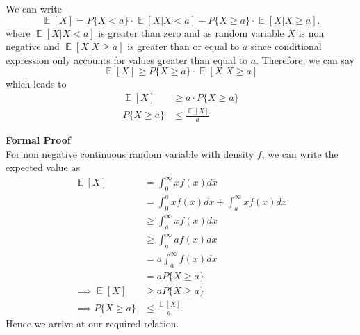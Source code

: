 \begin{solution}
 We can write 
 \begin{equation}
     \mathop{\mathbb{E}}[X]= P\{X<a\}\cdot \mathop{\mathbb{E}}[X|X<a]+P\{X\geq a\}\cdot  \mathop{\mathbb{E}}[X|X\geq a].
 \end{equation}
 where $\mathop{\mathbb{E}}[X|X<a]$ is greater than zero and as random variable $X $ is non negative and $\mathop{\mathbb{E}}[X|X\geq a]$ is greater than or equal to $a$ since conditional expression only accounts for values greater than equal to $a$. Therefore, we can say
 \begin{equation}
     \mathop{\mathbb{E}}[X]\geq P\{X\geq a\}\cdot  \mathop{\mathbb{E}}[X|X\geq a]
 \end{equation}
 which leads to 
 \begin{align}   
     \mathop{\mathbb{E}}[X] &\geq a\cdot P\{X\geq a\}\\
     P\{X\geq a\} &\leq \frac{\mathop{\mathbb{E}}[X]}{a}
 \end{align}

 \textbf{Formal Proof} \\
 For non negative continuous random variable with density $f$, we can write the expected value as 
 \begin{align} 
     \mathop{\mathbb{E}}[X]&=\int_{0}^{\infty}xf(x)dx \\
     & = \int_{0}^{a}xf(x)dx + \int_{a}^{\infty}xf(x)dx \\
     & \geq \int_{a}^{\infty}xf(x)dx \\
     & \geq \int_{a}^{\infty}af(x)dx \\
     &= a \int_{a}^{\infty}f(x)dx \\
     &=aP\{X\geq a\} \\
     \implies \mathop{\mathbb{E}}[X]& \geq aP\{X\geq a\}\\
     \implies P\{X\geq a\} &\leq \frac{\mathop{\mathbb{E}}[X]}{a}
 \end{align}
 Hence we arrive at our required relation.
     

\end{solution}
